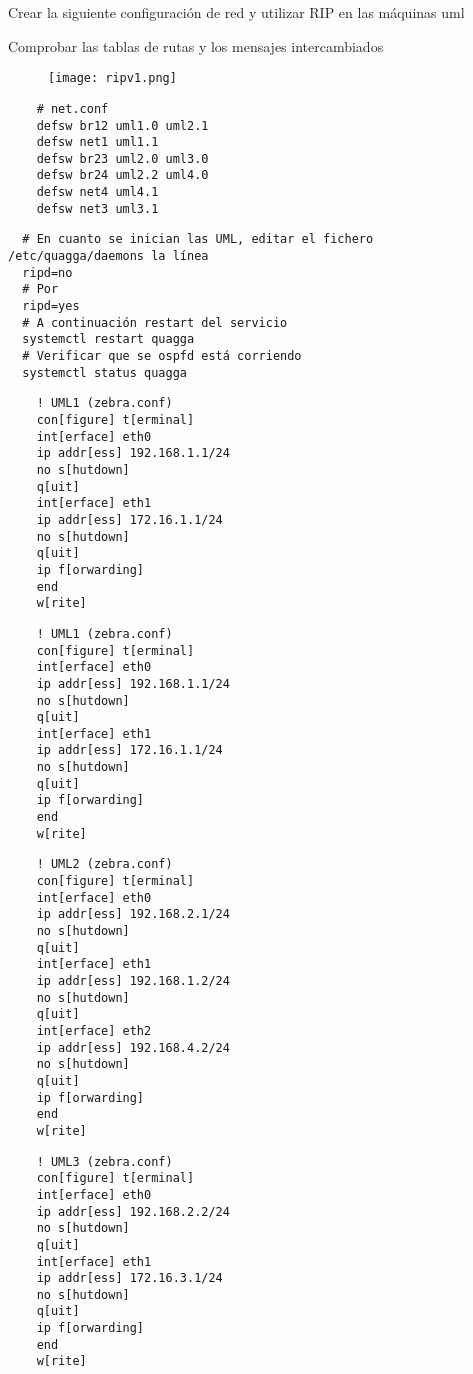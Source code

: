Crear la siguiente configuración de red y utilizar RIP en las
máquinas uml

Comprobar las tablas de rutas y los mensajes intercambiados

  \begin{figure}[h]
    \texttt{[image: ripv1.png]}
    \centering
  \end{figure}

  \begin{verbatim}
    # net.conf
    defsw br12 uml1.0 uml2.1
    defsw net1 uml1.1
    defsw br23 uml2.0 uml3.0
    defsw br24 uml2.2 uml4.0
    defsw net4 uml4.1
    defsw net3 uml3.1
  \end{verbatim}

  \begin{verbatim}
  # En cuanto se inician las UML, editar el fichero /etc/quagga/daemons la línea
  ripd=no
  # Por
  ripd=yes
  # A continuación restart del servicio
  systemctl restart quagga
  # Verificar que se ospfd está corriendo
  systemctl status quagga
\end{verbatim}

  \begin{verbatim}
    ! UML1 (zebra.conf)
    con[figure] t[erminal]
    int[erface] eth0
    ip addr[ess] 192.168.1.1/24
    no s[hutdown]
    q[uit]
    int[erface] eth1
    ip addr[ess] 172.16.1.1/24
    no s[hutdown]
    q[uit]
    ip f[orwarding]
    end
    w[rite]
  \end{verbatim}

  \begin{verbatim}
    ! UML1 (zebra.conf)
    con[figure] t[erminal]
    int[erface] eth0
    ip addr[ess] 192.168.1.1/24
    no s[hutdown]
    q[uit]
    int[erface] eth1
    ip addr[ess] 172.16.1.1/24
    no s[hutdown]
    q[uit]
    ip f[orwarding]
    end
    w[rite]
  \end{verbatim}

  \begin{verbatim}
    ! UML2 (zebra.conf)
    con[figure] t[erminal]
    int[erface] eth0
    ip addr[ess] 192.168.2.1/24
    no s[hutdown]
    q[uit]
    int[erface] eth1
    ip addr[ess] 192.168.1.2/24
    no s[hutdown]
    q[uit]
    int[erface] eth2
    ip addr[ess] 192.168.4.2/24
    no s[hutdown]
    q[uit]
    ip f[orwarding]
    end
    w[rite]
  \end{verbatim}

  \begin{verbatim}
    ! UML3 (zebra.conf)
    con[figure] t[erminal]
    int[erface] eth0
    ip addr[ess] 192.168.2.2/24
    no s[hutdown]
    q[uit]
    int[erface] eth1
    ip addr[ess] 172.16.3.1/24
    no s[hutdown]
    q[uit]
    ip f[orwarding]
    end
    w[rite]
  \end{verbatim}

